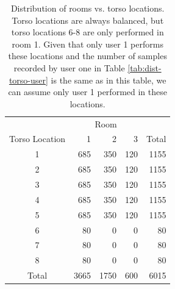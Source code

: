 \begin{table}[tbp]
	\centering
	\begin{tabular}{@{}crrrr@{}}
		\toprule
		& \multicolumn{3}{c}{Room} & \multicolumn{1}{l}{} \\
		Torso Location & 1       & 2      & 3     & Total                \\ \midrule
		1              & 685     & 350    & 120   & 1155                 \\
		2              & 685     & 350    & 120   & 1155                 \\
		3              & 685     & 350    & 120   & 1155                 \\
		4              & 685     & 350    & 120   & 1155                 \\
		5              & 685     & 350    & 120   & 1155                 \\
		6              & 80      & 0      & 0     & 80                   \\
		7              & 80      & 0      & 0     & 80                   \\
		8              & 80      & 0      & 0     & 80                   \\ \midrule
		Total          & 3665    & 1750   & 600   & 6015                 \\ \bottomrule
	\end{tabular}
	\caption{Distribution of rooms vs. torso locations. Torso locations are always balanced, but torso locations 6-8 are only performed in room 1. Given that only user 1 performs these locations and the number of samples recorded by user one in Table \ref{tab:dist-torso-user} is the same as in this table, we can assume only user 1 performed in these locations.}
\end{table}

